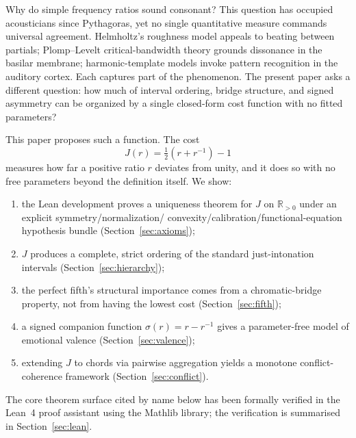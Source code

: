 \documentclass[11pt,a4paper]{article}
\begin{document}
Why do simple frequency ratios sound consonant?  This question has
occupied acousticians since Pythagoras, yet no single quantitative
measure commands universal agreement.  Helmholtz's roughness model
\citep{helmholtz1863} appeals to beating between partials;
Plomp--Levelt critical-bandwidth theory \citep{plomp1965} grounds
dissonance in the basilar membrane; harmonic-template models
\citep{parncutt2011} invoke pattern recognition in the auditory
cortex.  Each captures part of the phenomenon.  The present paper asks a
different question: how much of interval ordering, bridge structure,
and signed asymmetry can be organized by a single closed-form cost
function with no fitted parameters?

This paper proposes such a function.  The cost
\begin{equation}
  \label{eq:jcost-intro}
  J(r) = \tfrac{1}{2}\!\left(r + r^{-1}\right) - 1
\end{equation}
measures how far a positive ratio $r$ deviates from unity, and it does
so with no free parameters beyond the definition itself.  We show:

\begin{enumerate}[label=(\arabic*)]
  \item the Lean development proves a uniqueness theorem for $J$ on
    $\mathbb{R}_{>0}$ under an explicit symmetry/normalization/
    convexity/calibration/functional-equation hypothesis bundle
    (Section~\ref{sec:axioms});
  \item $J$ produces a complete, strict ordering of the standard
    just-intonation intervals (Section~\ref{sec:hierarchy});
  \item the perfect fifth's structural importance comes from a
    chromatic-bridge property, not from having the lowest cost
    (Section~\ref{sec:fifth});
  \item a signed companion function $\sigma(r)=r-r^{-1}$ gives a
    parameter-free model of emotional valence
    (Section~\ref{sec:valence});
  \item extending $J$ to chords via pairwise aggregation yields a
    monotone conflict-coherence framework
    (Section~\ref{sec:conflict}).
\end{enumerate}

\noindent The core theorem surface cited by name below has been
formally verified in the Lean~4 proof assistant \citep{moura2021} using
the Mathlib library; the verification is summarised in
Section~\ref{sec:lean}.

\end{document}
